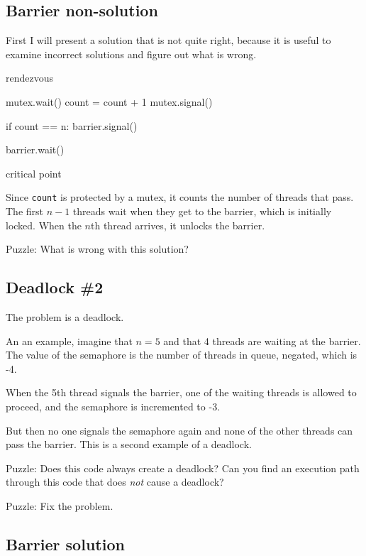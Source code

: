 \documentclass{book}
\begin{document}
\subsection {Barrier non-solution}

First I will present a solution that is not quite right, because
it is useful to examine incorrect solutions and figure out what
is wrong.


\begin{unbreakable}[title={Barrier non-solution}]{}
rendezvous

mutex.wait()
    count = count + 1
mutex.signal()

if count == n: barrier.signal()

barrier.wait()

critical point
\end{unbreakable}

Since {\tt count} is protected by a mutex, it counts the number of
threads that pass.  The first $n-1$ threads wait when they get to the
barrier, which is initially locked.  When the $n$th thread arrives, it
unlocks the barrier.

Puzzle:  What is wrong with this solution?



\subsection{Deadlock \#2}

The problem is a deadlock.

An an example, imagine that $n=5$
and that 4 threads are waiting at the barrier.  The value
of the semaphore is the number of threads in queue, negated,
which is -4.

When the 5th thread signals the barrier, one of the waiting
threads is allowed to proceed, and the semaphore is incremented
to -3.

But then no one signals the semaphore again and none of the
other threads can pass the barrier.
This is a second example of a deadlock.

Puzzle: Does this code always create a deadlock?  Can you find an
execution path through this code that does {\em not} cause a deadlock?

Puzzle: Fix the problem.




\subsection{Barrier solution}
\label{barrier}
\end{document}
